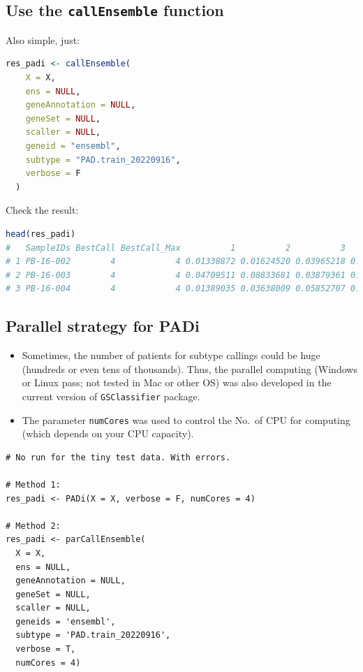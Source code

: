 \documentclass[
  12pt,
]{book}
\newcommand{\passthrough}[1]{#1}
\begin{document}
\hypertarget{use-the-callensemble-function}{%
\subsection{\texorpdfstring{Use the \texttt{callEnsemble} function}{Use the callEnsemble function}}\label{use-the-callensemble-function}}

Also simple, just:

\begin{lstlisting}[language=R]
res_padi <- callEnsemble(
    X = X,
    ens = NULL,
    geneAnnotation = NULL,
    geneSet = NULL,
    scaller = NULL,
    geneid = "ensembl",
    subtype = "PAD.train_20220916",
    verbose = F
  )
\end{lstlisting}

Check the result:

\begin{lstlisting}[language=R]
head(res_padi)
#   SampleIDs BestCall BestCall_Max          1          2          3         4
# 1 PB-16-002        4            4 0.01338872 0.01624520 0.03965218 0.8052567
# 2 PB-16-003        4            4 0.04709511 0.08833681 0.03879361 0.6244038
# 3 PB-16-004        4            4 0.01389035 0.03638009 0.05852707 0.6980438
\end{lstlisting}

\hypertarget{parallel-strategy-for-padi}{%
\subsection{Parallel strategy for PADi}\label{parallel-strategy-for-padi}}

\begin{itemize}
\item
  Sometimes, the number of patients for subtype callings could be huge (hundreds or even tens of thousands). Thus, the parallel computing (Windows or Linux pass; not tested in Mac or other OS) was also developed in the current version of \passthrough{\lstinline!GSClassifier!} package.
\item
  The parameter \passthrough{\lstinline!numCores!} was used to control the No.~of CPU for computing (which depends on your CPU capacity).
\end{itemize}

\begin{lstlisting}
# No run for the tiny test data. With errors.

# Method 1:
res_padi <- PADi(X = X, verbose = F, numCores = 4)

# Method 2: 
res_padi <- parCallEnsemble(
  X = X,
  ens = NULL,
  geneAnnotation = NULL,
  geneSet = NULL,
  scaller = NULL,
  geneids = 'ensembl',
  subtype = 'PAD.train_20220916',
  verbose = T,
  numCores = 4)
\end{lstlisting}
\end{document}
